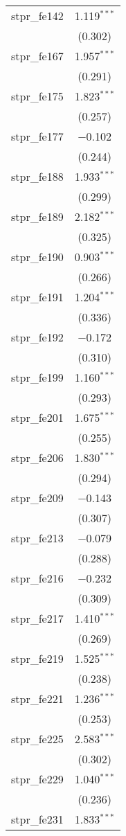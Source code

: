\begin{table}[!htbp]
\begin{tabular}{@{\extracolsep{5pt}}lc}
  stpr\_fe142 & 1.119$^{***}$ \\ 
  & (0.302) \\ 
  stpr\_fe167 & 1.957$^{***}$ \\ 
  & (0.291) \\ 
  stpr\_fe175 & 1.823$^{***}$ \\ 
  & (0.257) \\ 
  stpr\_fe177 & $-$0.102 \\ 
  & (0.244) \\ 
  stpr\_fe188 & 1.933$^{***}$ \\ 
  & (0.299) \\ 
  stpr\_fe189 & 2.182$^{***}$ \\ 
  & (0.325) \\ 
  stpr\_fe190 & 0.903$^{***}$ \\ 
  & (0.266) \\ 
  stpr\_fe191 & 1.204$^{***}$ \\ 
  & (0.336) \\ 
  stpr\_fe192 & $-$0.172 \\ 
  & (0.310) \\ 
  stpr\_fe199 & 1.160$^{***}$ \\ 
  & (0.293) \\ 
  stpr\_fe201 & 1.675$^{***}$ \\ 
  & (0.255) \\ 
  stpr\_fe206 & 1.830$^{***}$ \\ 
  & (0.294) \\ 
  stpr\_fe209 & $-$0.143 \\ 
  & (0.307) \\ 
  stpr\_fe213 & $-$0.079 \\ 
  & (0.288) \\ 
  stpr\_fe216 & $-$0.232 \\ 
  & (0.309) \\ 
  stpr\_fe217 & 1.410$^{***}$ \\ 
  & (0.269) \\ 
  stpr\_fe219 & 1.525$^{***}$ \\ 
  & (0.238) \\ 
  stpr\_fe221 & 1.236$^{***}$ \\ 
  & (0.253) \\ 
  stpr\_fe225 & 2.583$^{***}$ \\ 
  & (0.302) \\ 
  stpr\_fe229 & 1.040$^{***}$ \\ 
  & (0.236) \\ 
  stpr\_fe231 & 1.833$^{***}$ \\ 

\end{tabular}
\end{table}

